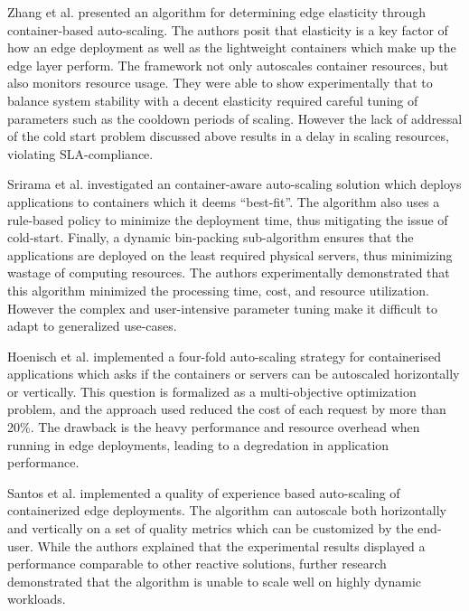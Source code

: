 Zhang et al. \cite{zhang2019quantifying} presented an algorithm for determining edge elasticity through container-based auto-scaling. The authors posit that elasticity is a key factor of how an edge deployment as well as the lightweight containers which make up the edge layer perform. The framework not only autoscales container resources, but also monitors resource usage. They were able to show experimentally that to balance system stability with a decent elasticity required careful tuning of parameters such as the cooldown periods of scaling. However the lack of addressal of the cold start problem discussed above results in a delay in scaling resources, violating SLA-compliance.\par

Srirama et al. \cite{srirama2020application} investigated an container-aware auto-scaling solution which deploys applications to containers which it deems ``best-fit''. The algorithm also uses a rule-based policy to minimize the deployment time, thus mitigating the issue of cold-start. Finally, a dynamic bin-packing sub-algorithm ensures that the applications are deployed on the least required physical servers, thus minimizing wastage of computing resources. The authors experimentally demonstrated that this algorithm minimized  the processing time, cost, and resource utilization. However the complex and user-intensive parameter tuning make it difficult to adapt to generalized use-cases.\par

Hoenisch et al. \cite{hoenisch2015four} implemented a four-fold auto-scaling strategy for containerised applications which asks if the containers or servers can be autoscaled horizontally or vertically. This question is formalized as a multi-objective optimization problem, and the approach used reduced the cost of each request by more than 20\%. The drawback is the heavy performance and resource overhead when running in edge deployments, leading to a degredation in application performance.\par

Santos et al. \cite{santos2020qoe} implemented a quality of experience based auto-scaling of containerized edge deployments. The algorithm can autoscale both horizontally and vertically on a set of quality metrics which can be customized by the end-user. While the authors explained that the experimental results displayed a performance comparable to other reactive solutions, further research demonstrated that the algorithm is unable to scale well on highly dynamic workloads.\par

